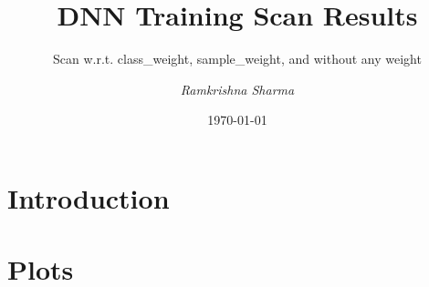 \documentclass[slidestop,compress,mathserif,aspectratio=169]{beamer}
\title[Priliminary Plots]{DNN Training Scan Results}
\subtitle{Scan w.r.t. class\_weight, sample\_weight, and without any weight}
\date[\today]{\today}
\author[Ram krishna Sharma]{
		\emph{Ramkrishna Sharma}\inst{1}
		}
\institute[Delhi,INDIA]{
			\inst{1}IHEP, Beijing
		}
\begin{document}

%
%
{
\begin{frame}
\titlepage
\end{frame}
}

\section{Introduction}

\section{Plots}
\end{document}
